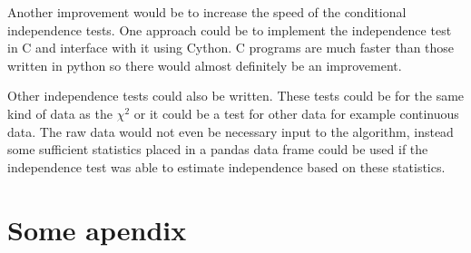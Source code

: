 \documentclass{UoYCSproject}
\begin{document}
Another improvement would be to increase the speed of the conditional independence tests. One approach could be to implement the independence test in C and interface with it using Cython. C programs are much faster than those written in python so there would almost definitely be an improvement.

Other independence tests could also be written. These tests could be for the same kind of data as the $\chi^2$ or it could be a test for other data for example continuous data. The raw data would not even be necessary input to the algorithm, instead some sufficient statistics placed in a pandas data frame could be used if the independence test was able to estimate independence based on these statistics.

\appendix
\chapter{Some apendix}
\printbibliography
\end{document}
